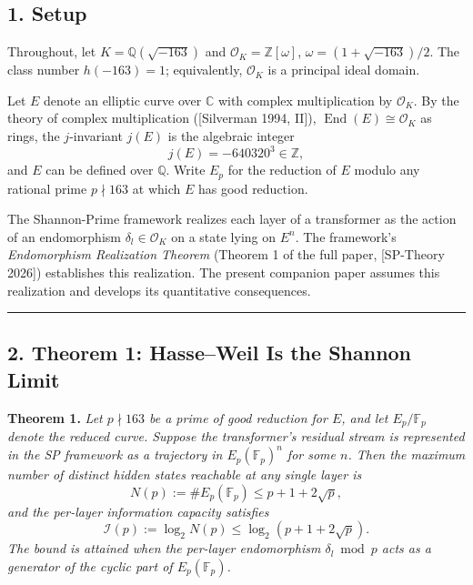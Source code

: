 \documentclass[
  11pt,
]{article}
\begin{document}
\hypertarget{setup}{%
\subsection{1. Setup}\label{setup}}

Throughout, let \(K = \mathbb{Q}(\sqrt{-163})\) and
\(\mathcal{O}_K = \mathbb{Z}[\omega]\),
\(\omega = (1 + \sqrt{-163})/2\). The class number \(h(-163) = 1\);
equivalently, \(\mathcal{O}_K\) is a principal ideal domain.

Let \(E\) denote an elliptic curve over \(\mathbb{C}\) with complex
multiplication by \(\mathcal{O}_K\). By the theory of complex
multiplication ({[}Silverman 1994, II{]}),
\(\operatorname{End}(E) \cong \mathcal{O}_K\) as rings, the
\(j\)-invariant \(j(E)\) is the algebraic integer
\[j(E) = -640320^3 \in \mathbb{Z},\] and \(E\) can be defined over
\(\mathbb{Q}\). Write \(E_p\) for the reduction of \(E\) modulo any
rational prime \(p \nmid 163\) at which \(E\) has good reduction.

The Shannon-Prime framework realizes each layer of a transformer as the
action of an endomorphism \(\delta_l \in \mathcal{O}_K\) on a state
lying on \(E^n\). The framework's \emph{Endomorphism Realization
Theorem} (Theorem 1 of the full paper, {[}SP-Theory 2026{]}) establishes
this realization. The present companion paper assumes this realization
and develops its quantitative consequences.

\begin{center}\rule{0.5\linewidth}{0.5pt}\end{center}

\hypertarget{theorem-1-hasseweil-is-the-shannon-limit}{%
\subsection{2. Theorem 1: Hasse--Weil Is the Shannon
Limit}\label{theorem-1-hasseweil-is-the-shannon-limit}}

\textbf{Theorem 1.} \emph{Let \(p \nmid 163\) be a prime of good
reduction for \(E\), and let \(E_p / \mathbb{F}_p\) denote the reduced
curve. Suppose the transformer's residual stream is represented in the
SP framework as a trajectory in \(E_p(\mathbb{F}_p)^n\) for some \(n\).
Then the maximum number of distinct hidden states reachable at any
single layer is} \[N(p) := \#E_p(\mathbb{F}_p) \leq p + 1 + 2\sqrt{p},\]
\emph{and the per-layer information capacity satisfies}
\[\mathcal{I}(p) := \log_2 N(p) \leq \log_2(p + 1 + 2\sqrt{p}).\]
\emph{The bound is attained when the per-layer endomorphism
\(\delta_l \bmod p\) acts as a generator of the cyclic part of
\(E_p(\mathbb{F}_p)\).}
\end{document}
